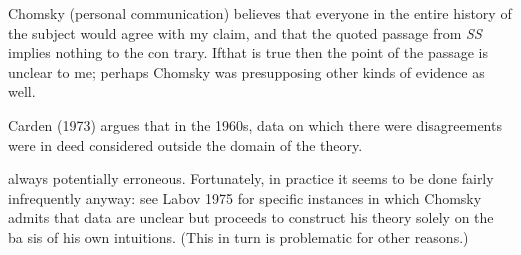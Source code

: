 \begin{listWWNumlxvleveli}
\item 
\begin{styleStandard}
Chomsky (personal communication) believes that {\textquotedbl}everyone in the entire history of the subject would agree{\textquotedbl} with my claim, and that the quoted passage from \textit{SS}\textit{ }implies nothing to the con\- trary. Ifthat is true then the point of the passage is unclear to me; perhaps Chomsky was presupposing other kinds of evidence as well.
\end{styleStandard}


\end{listWWNumlxvleveli}
\setcounter{listWWNumlxivleveli}{8}
\begin{listWWNumlxivleveli}
\item 
\begin{styleStandard}
Carden (1973) argues that in the 1960s, data on which there were disagreements were in\- deed considered outside the domain of the theory.
\end{styleStandard}


\end{listWWNumlxivleveli}
\clearpage\setcounter{page}{1}\begin{styleTextbody}
always potentially erroneous. Fortunately, in practice it seems to be done fairly infrequently anyway: see Labov 1975 for specific instances in which Chomsky admits that data are unclear but proceeds to construct his theory solely on the ba\- sis of his own intuitions. (This in turn is problematic for other reasons.)
\end{styleTextbody}


